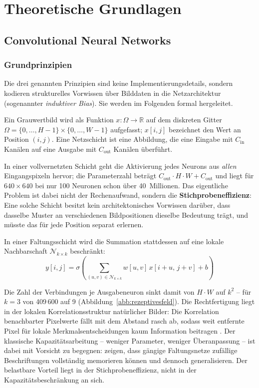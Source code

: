 \chapter{Theoretische Grundlagen}
\label{kap:theorie}

\section{Convolutional Neural Networks}
\label{sec:cnn}

\subsection{Grundprinzipien}
\label{sec:prinzipien}

Die drei genannten Prinzipien sind keine Implementierungsdetails, sondern
kodieren strukturelles Vorwissen über Bilddaten in die Netzarchitektur
(sogenannter \emph{induktiver Bias}). Sie werden im Folgenden formal hergeleitet.

Ein Grauwertbild wird als Funktion $x: \Omega \to \mathbb{R}$
auf dem diskreten Gitter $\Omega = \{0,\dots,H-1\} \times \{0,\dots,W-1\}$
aufgefasst; $x[i,j]$ bezeichnet den Wert an Position $(i,j)$. Eine Netzschicht
ist eine Abbildung, die eine Eingabe mit $C_{\text{in}}$ Kanälen auf eine
Ausgabe mit $C_{\text{out}}$ Kanälen überführt.

 In einer vollvernetzten Schicht geht die
Aktivierung jedes Neurons aus \emph{allen} Eingangspixeln hervor; die
Parameterzahl beträgt $C_{\text{out}} \cdot H \cdot W + C_{\text{out}}$ und
liegt für $640\times640$ bei nur 100 Neuronen schon über 40~Millionen. Das
eigentliche Problem ist dabei nicht der Rechenaufwand, sondern die
\textbf{Stichprobeneffizienz}: Eine solche Schicht besitzt kein
architektonisches Vorwissen darüber, dass dasselbe Muster an verschiedenen
Bildpositionen dieselbe Bedeutung trägt, und müsste das für jede Position
separat erlernen.

In einer Faltungsschicht wird die Summation stattdessen auf eine lokale
Nachbarschaft $\mathcal{N}_{k \times k}$ beschränkt:
\begin{equation}
y[i,j] = \sigma\!\left(\sum_{(u,v)\in\mathcal{N}_{k\times k}} w[u,v]\,
x[i+u,\,j+v] + b\right)
\label{eq:conv}
\end{equation}

Die Zahl der Verbindungen je Ausgabeneuron sinkt damit von $H \cdot W$ auf $k^2$
-- für $k = 3$ von 409\,600 auf 9 (Abbildung~\ref{abb:rezeptivesfeld}). Die
Rechtfertigung liegt in der lokalen Korrelationsstruktur natürlicher Bilder: Die
Korrelation benachbarter Pixelwerte fällt mit dem Abstand rasch ab, sodass weit
entfernte Pixel für lokale Merkmalsentscheidungen kaum Information beitragen
\parencite{lecun1998}. Der klassische Kapazitätsarbeitung -- weniger Parameter,
weniger Überanpassung -- ist dabei mit Vorsicht zu begegnen:
\textcite{zhang2017rethinking} zeigen, dass gängige Faltungsnetze zufällige
Beschriftungen vollständig memorieren können und dennoch generalisieren. Der
belastbare Vorteil liegt in der Stichprobeneffizienz, nicht in der
Kapazitätsbeschränkung an sich.

